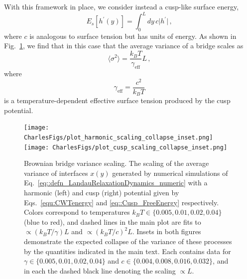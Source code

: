 \documentclass[twoside,twocolumn,9pt]{article}
\begin{document}
With this framework in place, we consider instead a cusp-like surface energy,
\begin{equation}
    \label{eq::Cusp_FreeEnergy}
    E_s[{h}^{\prime}(y)] = \int_{0}^{L}dy\,c\big|h^{\prime}\big|\, ,
\end{equation}
where $c$ is analogous to surface tension but has units of energy. As shown in Fig.~\ref{fig:brownianBridge}, we find that in this case that the average variance of a bridge scales as
\begin{equation}
    \label{eq::varianceCusp}
    \langle\sigma^{2}\rangle = \frac{k_{B}T}{\gamma_{\text{eff}}}L\,,
\end{equation}
where
\begin{equation}
    \label{eq:cuspSurfaceTension}
    \gamma_{\text{eff}} = \frac{c^{2}}{k_{B}T}
\end{equation}
is a temperature-dependent effective surface tension produced by the cusp potential.

\begin{figure}[t]
    \centering    \texttt{[image: CharlesFigs/plot\_harmonic\_scaling\_collapse\_inset.png]}
    \texttt{[image: CharlesFigs/plot\_cusp\_scaling\_collapse\_inset.png]}
    \caption{Brownian bridge variance scaling. The scaling of the average variance of interfaces $x(y)$ generated by numerical simulations of Eq.~\ref{eq::defn_LandauRelaxationDynamics_numeric} with a harmonic (left) and cusp (right) potential given by Eqs.~\ref{equ:CWTenergy} and \ref{eq::Cusp_FreeEnergy} respectively. Colors correspond to temperatures $k_{B}T\in\{0.005, 0.01, 0.02, 0.04\}$ (blue to red), and dashed lines in the main plot are fits to $\propto({k_BT}/\gamma)L$ and $\propto({k_{B}T}/c)^{2}L$. Insets in both figures demonstrate the expected collapse of the variance of these processes by the quantities indicated in the main text. Each contains data for $\gamma\in\{0.005, 0.01, 0.02, 0.04\}$ and $c\in\{0.004, 0.008, 0.016, 0.032\}$, and in each the dashed black line denoting the scaling $\propto{L}$.}
    \label{fig:brownianBridge}
\end{figure}
\end{document}
